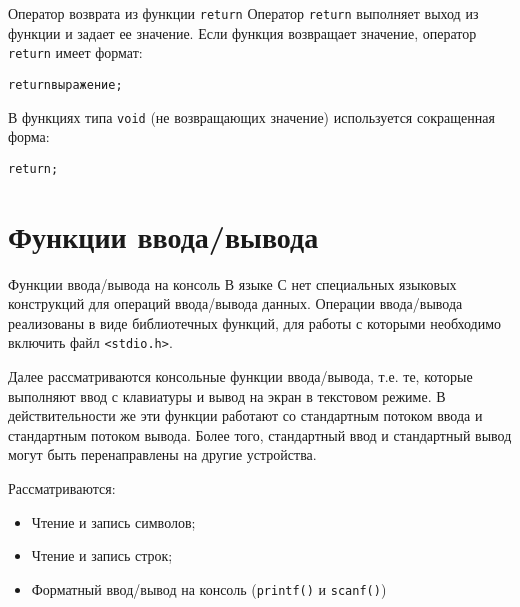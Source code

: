 \documentclass[xcolor=table]{beamer}
\begin{document}
\begin{frame}{Оператор возврата из функции \texttt{return}}
    Оператор \texttt{return} выполняет выход из функции и задает ее значение. Если функция возвращает значение, оператор \texttt{return} имеет формат:
    \begin{alltt}
        return выражение;
    \end{alltt}
    В функциях типа \texttt{void} (не возвращающих значение) используется сокращенная форма:
    \begin{alltt}
        return;
    \end{alltt}
\end{frame}

\section{Функции ввода/вывода}

\begin{frame}{Функции ввода/вывода на консоль}
    В языке С нет специальных языковых конструкций для операций ввода/вывода данных. Операции ввода/вывода реализованы в виде библиотечных функций, для работы с которыми необходимо включить файл \texttt{<stdio.h>}.
    
    Далее рассматриваются консольные функции ввода/вывода, т.е. те, которые выполняют ввод с клавиатуры и вывод на экран в текстовом режиме. В действительности же эти функции работают со стандартным потоком ввода и стандартным потоком вывода. Более того, стандартный ввод и стандартный вывод могут быть перенаправлены на другие устройства.
    
    Рассматриваются:
    \begin{itemize}
        \item Чтение и запись символов;
        \item Чтение и запись строк;
        \item Форматный ввод/вывод на консоль (\texttt{printf()} и \texttt{scanf()})
    \end{itemize}
\end{frame}
\end{document}

